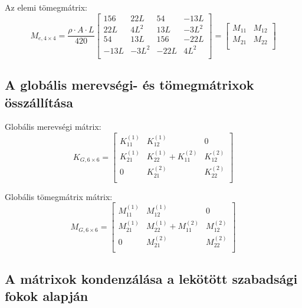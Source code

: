 \documentclass{article}
\begin{document}
			Az elemi tömegmátrix:
			\begin{equation}
				M_{e,4\times4}= \frac{\rho \cdot A \cdot L}{420}  
				\begin{bmatrix}
				156&22L&54&-13L\\
				22L&4L^2&13L&-3L^2\\
				54&13L&156&-22L\\
				-13L&-3L^2&-22L&4L^2\\
				\end{bmatrix}
				=\begin{bmatrix}
				M_{11} &M_{12} \\
				M_{21} &M_{22} \\
				\end{bmatrix}
			\end{equation}
	
	
	
		\subsection{A globális merevségi- és tömegmátrixok összállítása}
	
			Globális merevségi mátrix:
			\begin{equation}
				K_{G,6\times6}=
				\begin{bmatrix}
				K_{11}^{(1)} & K_{12}^{(1)}              & 0            \\
				K_{21}^{(1)} & K_{22}^{(1)}+K_{11}^{(2)} & K_{12}^{(2)} \\
				0            & K_{21}^{(2)}              & K_{22}^{(2)} \\
				\end{bmatrix}
			\end{equation}
			
			Globális tömegmátrix mátrix:
			\begin{equation}
				M_{G,6\times6}=
				\begin{bmatrix}
				M_{11}^{(1)} & M_{12}^{(1)}              & 0            \\
				M_{21}^{(1)} & M_{22}^{(1)}+M_{11}^{(2)} & M_{12}^{(2)} \\
				0            & M_{21}^{(2)}              & M_{22}^{(2)} \\
				\end{bmatrix}
			\end{equation}
	
	
		\subsection{A mátrixok kondenzálása a lekötött szabadsági fokok alapján}
	
\end{document}
